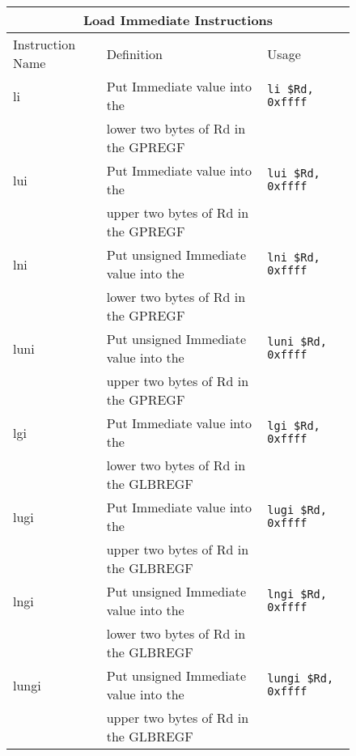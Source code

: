 \documentclass[letterpaper, 11pt]{article}
\begin{document}
\begin{figure}[!h]
	\begin{center}
		\begin{tabular}{|l|l|l|}
			\hline
			\multicolumn{3}{c}{Load Immediate Instructions} \\ \hline
			Instruction Name	& Definition								& Usage 						\\ \hline
			li					& Put Immediate value into the 				& \texttt{li \$Rd, 0xffff}		\\ 
			\hfill				& lower two bytes of Rd in the GPREGF		& \hfill						\\ \hline
			lui					& Put Immediate value into the  			& \texttt{lui \$Rd, 0xffff}		\\ 	
			\hfill				& upper two bytes of Rd in the GPREGF		& \hfill 						\\ \hline
			lni					& Put unsigned Immediate value into the		& \texttt{lni \$Rd, 0xffff}		\\ 
			\hfill				& lower two bytes of Rd in the GPREGF		& \hfill						\\ \hline
			luni				& Put unsigned Immediate value into the		& \texttt{luni \$Rd, 0xffff}	\\ 
			\hfill				& upper two bytes of Rd in the GPREGF		& \hfill 						\\ \hline

			lgi					& Put Immediate value into the 				& \texttt{lgi \$Rd, 0xffff}		\\ 
			\hfill				& lower two bytes of Rd in the GLBREGF		& \hfill						\\ \hline
			lugi				& Put Immediate value into the 				& \texttt{lugi \$Rd, 0xffff}	\\ 
			\hfill				& upper two bytes of Rd in the GLBREGF		& \hfill						\\ \hline
			lngi				& Put unsigned Immediate value into the		& \texttt{lngi \$Rd, 0xffff}	\\ 
			\hfill				& lower two bytes of Rd in the GLBREGF		& \hfill						\\ \hline
			lungi				& Put unsigned Immediate value into the 	& \texttt{lungi \$Rd, 0xffff}	\\ 
			\hfill				& upper two bytes of Rd in the GLBREGF		& \hfill						\\ \hline



\end{tabular}
\end{center}
\end{figure}
\end{document}
